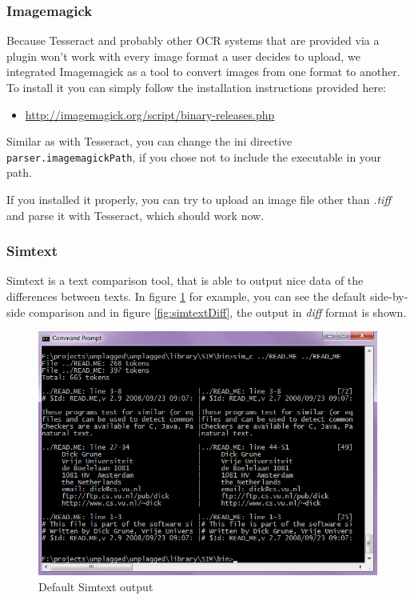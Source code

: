 \subsubsection{Imagemagick}

Because Tesseract and probably other OCR systems that are provided via a plugin won't work with every image format a 
user decides to upload, we integrated Imagemagick as a tool to convert images from one format to another. To install
it you can simply follow the installation instructions provided here:

\begin{itemize}
\item \url{http://imagemagick.org/script/binary-releases.php}
\end{itemize}

Similar as with Tesseract, you can change the ini directive \texttt{parser.imagemagickPath}, if you chose not to include
the executable in your path.

If you installed it properly, you can try to upload an image file other than \textit{.tiff} and parse it with Tesseract,
which should work now.

\subsubsection{Simtext}

Simtext is a text comparison tool, that is able to output nice data of the differences between texts. In figure 
\ref{fig:simtextOutput} for example, you can see the default side-by-side comparison and in figure \ref{fig:simtextDiff}, 
the output in \textit{diff} format is shown.

\begin{figure}[htbp]
  \centering
    \includegraphics[width=\textwidth]{images/simtext-output.png}
  \caption{Default Simtext output}
  \label{fig:simtextOutput}
\end{figure}

